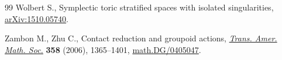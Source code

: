 \documentclass[pdftex]{sigma}
\numberwithin{equation}{section}
\begin{document}
\begin{thebibliography}{99}
Wolbert S., Symplectic toric stratif\/ied spaces with isolated singularities,
 \href{http://arxiv.org/abs/1510.05740}{arXiv:1510.05740}.

Zambon M., Zhu C., Contact reduction and groupoid actions, \href{https://doi.org/10.1090/S0002-9947-05-03832-8}{\textit{Trans. Amer.
 Math. Soc.}} \textbf{358} (2006), 1365--1401, \href{http://arxiv.org/abs/math.DG/0405047}{math.DG/0405047}.

\end{thebibliography}\LastPageEnding
\end{document}
